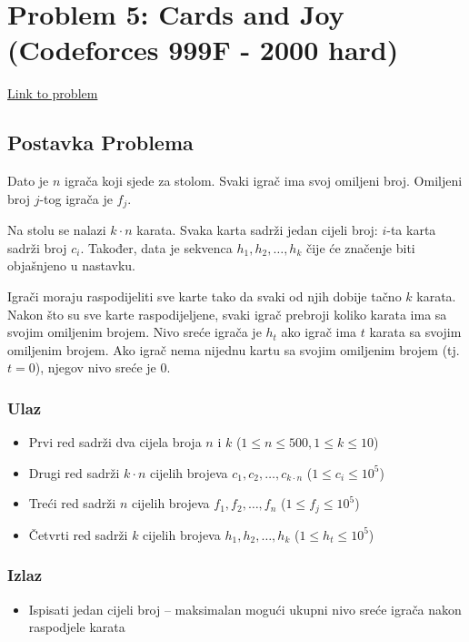 \section{Problem 5: Cards and Joy (Codeforces 999F - 2000 hard)}
\href{https://codeforces.com/problemset/problem/999/F}{Link to problem}

\subsection{Postavka Problema}
Dato je $n$ igrača koji sjede za stolom. Svaki igrač ima svoj omiljeni broj. Omiljeni broj $j$-tog igrača je $f_j$.

Na stolu se nalazi $k \cdot n$ karata. Svaka karta sadrži jedan cijeli broj: $i$-ta karta sadrži broj $c_i$. Također, data je sekvenca $h_1, h_2, \ldots, h_k$ čije će značenje biti objašnjeno u nastavku.

Igrači moraju raspodijeliti sve karte tako da svaki od njih dobije tačno $k$ karata. Nakon što su sve karte raspodijeljene, svaki igrač prebroji koliko karata ima sa svojim omiljenim brojem. Nivo sreće igrača je $h_t$ ako igrač ima $t$ karata sa svojim omiljenim brojem. Ako igrač nema nijednu kartu sa svojim omiljenim brojem (tj. $t=0$), njegov nivo sreće je 0.

\subsubsection{Ulaz}
\begin{itemize}
    \item Prvi red sadrži dva cijela broja $n$ i $k$ ($1 \leq n \leq 500, 1 \leq k \leq 10$)
    \item Drugi red sadrži $k \cdot n$ cijelih brojeva $c_1, c_2, \ldots, c_{k \cdot n}$ ($1 \leq c_i \leq 10^5$)
    \item Treći red sadrži $n$ cijelih brojeva $f_1, f_2, \ldots, f_n$ ($1 \leq f_j \leq 10^5$)
    \item Četvrti red sadrži $k$ cijelih brojeva $h_1, h_2, \ldots, h_k$ ($1 \leq h_t \leq 10^5$)
\end{itemize}

\subsubsection{Izlaz}
\begin{itemize}
    \item Ispisati jedan cijeli broj -- maksimalan mogući ukupni nivo sreće igrača nakon raspodjele karata
\end{itemize}

